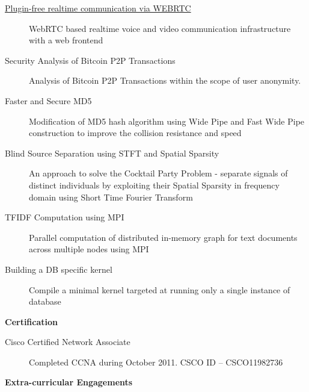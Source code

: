 \documentclass[letterpaper,11pt]{article}
\newcommand{\resheading}[1]{{\large \colorbox{mygrey}{\begin{minipage}{\textwidth}{\textbf{#1 \vphantom{p\^{E}}}}\end{minipage}}}}
\begin{document}
\begin{description}
\item[\href{https://github.com/dtsdwarak/webrtc-demo}{Plugin-free realtime communication via WEBRTC}] { \footnotesize WebRTC based realtime voice and video communication infrastructure with a web frontend}

\item[{Security Analysis of Bitcoin P2P Transactions}] { \footnotesize Analysis of Bitcoin P2P Transactions within the scope of user anonymity.}

\item[{Faster and Secure MD5}] { \footnotesize Modification of MD5 hash algorithm using Wide Pipe and Fast Wide Pipe construction to improve the collision resistance and speed}

\item[{Blind Source Separation using STFT and Spatial Sparsity}] { \footnotesize An approach to solve the Cocktail Party Problem - separate signals of distinct individuals by exploiting their Spatial Sparsity in frequency domain using Short Time Fourier Transform}

\item[{TFIDF Computation using MPI}] {\footnotesize Parallel computation of distributed in-memory graph for text documents across multiple nodes using MPI}

\item[{Building a DB specific kernel}] {\footnotesize Compile a minimal kernel targeted at running only a single instance of database}

\end{description}

\resheading{Certification}
\begin{description}

\item[Cisco Certified Network Associate] { \footnotesize Completed CCNA during October 2011. CSCO ID – CSCO11982736}

\end{description}

\resheading{Extra-curricular Engagements} 
\end{document}
